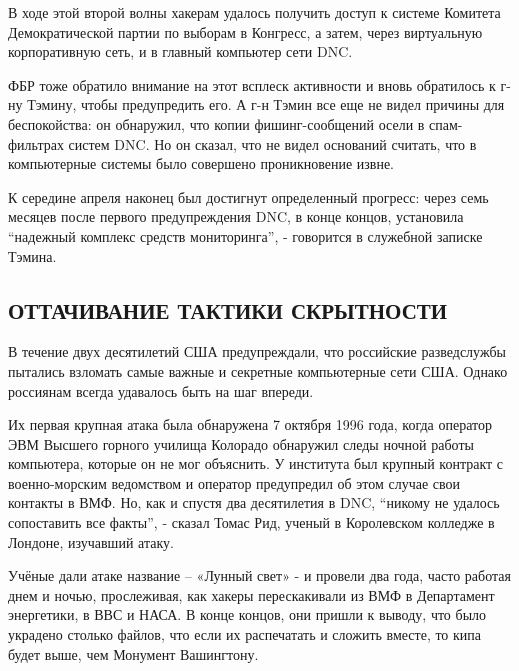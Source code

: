 В ходе этой второй волны хакерам удалось получить доступ к системе
Комитета Демократической партии по выборам в Конгресс, а затем, через
виртуальную корпоративную сеть, и в главный компьютер сети DNC.

ФБР тоже обратило внимание на этот всплеск активности и вновь обратилось
к г-ну Тэмину, чтобы предупредить его. А г-н Тэмин все еще не видел
причины для беспокойства: он обнаружил, что копии фишинг-сообщений осели
в спам-фильтрах систем DNC. Но он сказал, что не видел оснований
считать, что в компьютерные системы было совершено проникновение извне.

К середине апреля наконец был достигнут определенный прогресс: через
семь месяцев после первого предупреждения DNC, в конце концов,
установила ``надежный комплекс средств мониторинга'', - говорится в
служебной записке Тэмина.

\hypertarget{ux43eux442ux442ux430ux447ux438ux432ux430ux43dux438ux435-ux442ux430ux43aux442ux438ux43aux438-ux441ux43aux440ux44bux442ux43dux43eux441ux442ux438}{%
\subsection{\texorpdfstring{\textbf{ОТТАЧИВАНИЕ ТАКТИКИ
СКРЫТНОСТИ}}{ОТТАЧИВАНИЕ ТАКТИКИ СКРЫТНОСТИ}}\label{ux43eux442ux442ux430ux447ux438ux432ux430ux43dux438ux435-ux442ux430ux43aux442ux438ux43aux438-ux441ux43aux440ux44bux442ux43dux43eux441ux442ux438}}

В течение двух десятилетий США предупреждали, что российские
разведслужбы пытались взломать самые важные и секретные компьютерные
сети США. Однако россиянам всегда удавалось быть на шаг впереди.

Их первая крупная атака была обнаружена 7 октября 1996 года, когда
оператор ЭВМ Высшего горного училища Колорадо обнаружил следы ночной
работы компьютера, которые он не мог объяснить. У института был крупный
контракт с военно-морским ведомством и оператор предупредил об этом
случае свои контакты в ВМФ. Но, как и спустя два десятилетия в DNC,
``никому не удалось сопоставить все факты'', - сказал Томас Рид, ученый
в Королевском колледже в Лондоне, изучавший атаку.

Учёные дали атаке название -- «Лунный свет» - и провели два года, часто
работая днем и ночью, прослеживая, как хакеры перескакивали из ВМФ в
Департамент энергетики, в ВВС и НАСА. В конце концов, они пришли к
выводу, что было украдено столько файлов, что если их распечатать и
сложить вместе, то кипа будет выше, чем Монумент Вашингтону.

